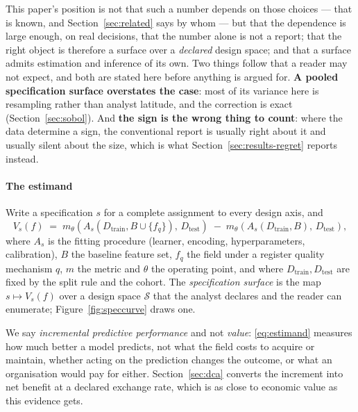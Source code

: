 \documentclass[preprint,12pt,authoryear]{elsarticle}
\theoremstyle{definition}
\begin{document}
This paper's position is not that such a number depends on those choices ---
that is known, and Section~\ref{sec:related} says by whom --- but that the
dependence is large enough, on real decisions, that the number alone is not a
report; that the right object is therefore a surface over a \emph{declared}
design space; and that a surface admits estimation and inference of its own.
Two things follow that a reader may not expect, and both are stated here
before anything is argued for. \textbf{A pooled specification
surface overstates the case}: most of its variance here is resampling rather
than analyst latitude, and the correction is exact
(Section~\ref{sec:sobol}). And \textbf{the sign is the wrong thing to count}:
where the data determine a sign, the conventional report is usually right
about it and usually silent about the size, which is what
Section~\ref{sec:results-regret} reports instead.

\paragraph{The estimand}
Write a specification $s$ for a complete assignment to every design axis, and
\begin{equation}
V_s(f) \;=\; m_\theta\!\left(A_s(D_{\mathrm{train}}, B \cup \{f_q\}),\,
D_{\mathrm{test}}\right)
\;-\;
m_\theta\!\left(A_s(D_{\mathrm{train}}, B),\, D_{\mathrm{test}}\right),
\label{eq:estimand}
\end{equation}
where $A_s$ is the fitting procedure (learner, encoding, hyperparameters,
calibration), $B$ the baseline feature set, $f_q$ the field under a register
quality mechanism $q$, $m$ the metric and $\theta$ the operating point, and
where $D_{\mathrm{train}}, D_{\mathrm{test}}$ are fixed by the split rule and
the cohort. The \emph{specification surface} is the map
$s \mapsto V_s(f)$ over a design space $\mathcal{S}$ that the analyst declares
and the reader can enumerate; Figure~\ref{fig:speccurve} draws one.

We say \emph{incremental predictive performance} and not \emph{value}:
\eqref{eq:estimand} measures how much better a model predicts, not what the
field costs to acquire or maintain, whether acting on the prediction changes
the outcome, or what an organisation would pay for either.
Section~\ref{sec:dca} converts the increment into net benefit at a declared
exchange rate, which is as close to economic value as this evidence gets.
\end{document}
